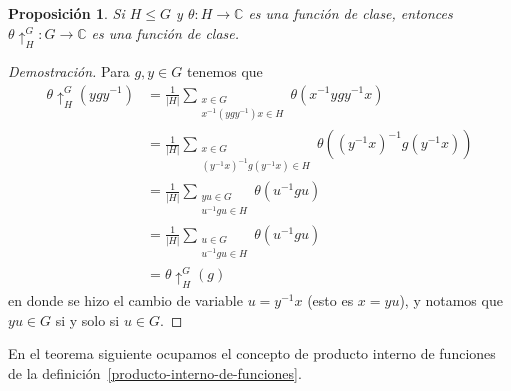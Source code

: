 \documentclass[12pt]{book}
\newtheorem{proposition}[theorem]{Proposición}
\theoremstyle{definition}
\newcounter{in}
\newcounter{ini}
\begin{document}
\begin{proposition}
  Si $H\leq G$ y $\theta:H\rightarrow \mathbb{C}$ es una función de
  clase, entonces $\theta\uparrow^{G}_{H}:G\rightarrow \mathbb{C}$ es
  una función de clase. 
\end{proposition}
\begin{proof}[Demostración]
  Para $g,y\in G$ tenemos que
  \begin{align*}
    \theta\uparrow^{G}_{H}(ygy^{-1})&=\frac{1}{|H|}\sum_{\substack{x\in
        G\\x^{-1}(ygy^{-1})x\in H}}\theta(x^{-1}ygy^{-1}x)\\
    &=\frac{1}{|H|}\sum_{\substack{x\in
        G\\(y^{-1}x)^{-1}g(y^{-1}x)\in H}}\theta((y^{-1}x)^{-1}g(y^{-1}x))\\
    &=\frac{1}{|H|}\sum_{\substack{yu\in
        G\\u^{-1}gu\in H}}\theta(u^{-1}gu)\\
     &=\frac{1}{|H|}\sum_{\substack{u\in
        G\\u^{-1}gu\in H}}\theta(u^{-1}gu)\\
    &=\theta\uparrow^{G}_{H}(g)
  \end{align*}
en donde se hizo el cambio de variable $u=y^{-1}x$ (esto es $x=yu$), y notamos
que $yu\in G$ si y solo si $u\in G$.
\end{proof}

En el teorema siguiente ocupamos el concepto de producto interno de
funciones de la definición~\ref{producto-interno-de-funciones}.
\end{document}
